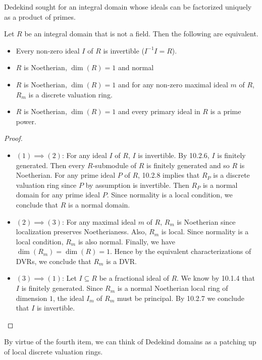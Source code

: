 \documentclass[a4paper]{article}
\begin{document}
Dedekind sought for an integral domain whose ideals can be factorized uniquely as a product of primes. 

\begin{prp}{}{} Let $R$ be an integral domain that is not a field. Then the following are equivalent. 
\begin{itemize}
\item Every non-zero ideal $I$ of $R$ is invertible ($I^{-1}I=R$). 
\item $R$ is Noetherian, $\dim(R)=1$ and normal
\item $R$ is Noetherian, $\dim(R)=1$ and for any non-zero maximal ideal $m$ of $R$, $R_m$ is a discrete valuation ring. 
\item $R$ is Noetherian, $\dim(R)=1$ and every primary ideal in $R$ is a prime power. 
\end{itemize} 
\begin{proof}~\\
\begin{itemize}
\item $(1)\implies(2)$: For any ideal $I$ of $R$, $I$ is invertible. By 10.2.6, $I$ is finitely generated. Then every $R$-submodule of $R$ is finitely generated and so $R$ is Noetherian. For any prime ideal $P$ of $R$, 10.2.8 implies that $R_P$ is a discrete valuation ring since $P$ by assumption is invertible. Then $R_P$ is a normal domain for any prime ideal $P$. Since normality is a local condition, we conclude that $R$ is a normal domain. 

\item $(2)\implies(3)$: For any maximal ideal $m$ of $R$, $R_m$ is Noetherian since localization preserves Noetherianess. Also, $R_m$ is local. Since normality is a local condition, $R_m$ is also normal. Finally, we have $\dim(R_m)=\dim(R)=1$. Hence by the equivalent characterizations of DVRs, we conclude that $R_m$ is a DVR. 

\item $(3)\implies(1)$: Let $I\subseteq R$ be a fractional ideal of $R$. We know by 10.1.4 that $I$ is finitely generated. Since $R_m$ is a normal Noetherian local ring of dimension $1$, the ideal $I_m$ of $R_m$ must be principal. By 10.2.7 we conclude that $I$ is invertible. \\

\end{itemize}
\end{proof}
\end{prp}

By virtue of the fourth item, we can think of Dedekind domains as a patching up of local discrete valuation rings. \\
\end{document}
